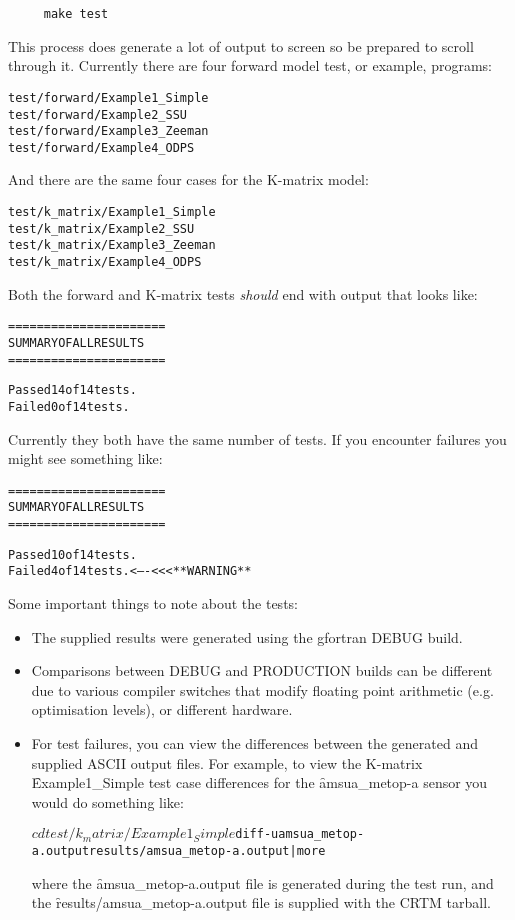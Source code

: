 \begin{verbatim}     make test\end{verbatim}
   
This process does generate a lot of output to screen so be prepared to scroll through it. Currently there are four forward model test, or example, programs:
\begin{alltt}
  test/forward/Example1_Simple
  test/forward/Example2_SSU
  test/forward/Example3_Zeeman
  test/forward/Example4_ODPS\end{alltt}
And there are the same four cases for the K-matrix model:
\begin{alltt}
  test/k_matrix/Example1_Simple
  test/k_matrix/Example2_SSU
  test/k_matrix/Example3_Zeeman
  test/k_matrix/Example4_ODPS\end{alltt}

Both the forward and K-matrix tests \emph{should} end with output that looks like:

\begin{alltt}
  ======================
  SUMMARY OF ALL RESULTS
  ======================

  Passed 14 of 14 tests.
  Failed 0 of 14 tests.\end{alltt}

Currently they both have the same number of tests. If you encounter failures you might see something like:

\begin{alltt}
  ======================
  SUMMARY OF ALL RESULTS
  ======================

  Passed 10 of 14 tests.
  Failed 4 of 14 tests.  <----<<<  **WARNING**\end{alltt}

Some important things to note about the tests:
\begin{itemize}
  \item The supplied results were generated using the gfortran DEBUG build.
  \item Comparisons between DEBUG and PRODUCTION builds can be different due to various compiler switches that modify floating point arithmetic (e.g. optimisation levels), or different hardware.
  \item For test failures, you can view the differences between the generated and supplied ASCII output files. For example, to view the K-matrix \f{Example1\_Simple} test case differences for the \f{amsua\_metop-a} sensor you would do something like:
\begin{alltt}
  $ cd test/k_matrix/Example1_Simple
  $ diff -u amsua_metop-a.output results/amsua_metop-a.output | more\end{alltt}

where the \f{amsua\_metop-a.output} file is generated during the test run, and the \f{results/amsua\_metop-a.output} file is supplied with the CRTM tarball.
\end{itemize}


